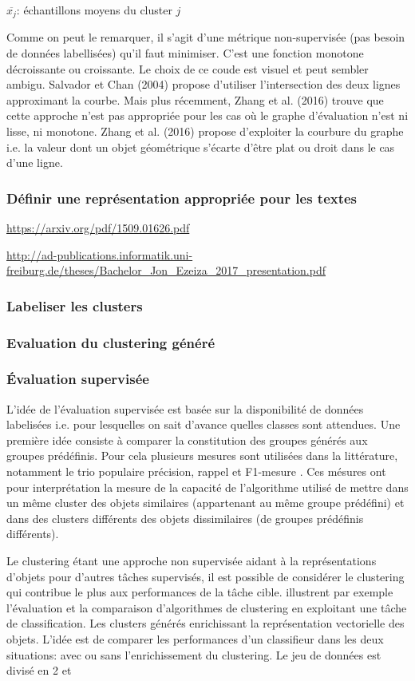 $\overline{x_j}$: échantillons moyens du cluster $j$

Comme on peut le remarquer, il s’agit d’une métrique non-supervisée (pas besoin de données labellisées) qu’il faut minimiser. C’est une fonction monotone décroissante ou croissante. Le choix de ce coude est visuel et peut sembler ambigu. Salvador et Chan (2004) propose d’utiliser l’intersection des deux lignes approximant la courbe. Mais plus récemment, Zhang et al. (2016) trouve que cette approche n’est pas appropriée pour les cas où le graphe d’évaluation n’est ni lisse, ni monotone. Zhang et al. (2016) propose d’exploiter la courbure du graphe i.e. la valeur dont un objet géométrique s'écarte d'être plat ou droit dans le cas d'une ligne.

\subsubsection{Définir une représentation appropriée pour les textes}
\url{https://arxiv.org/pdf/1509.01626.pdf}

\url{http://ad-publications.informatik.uni-freiburg.de/theses/Bachelor_Jon_Ezeiza_2017_presentation.pdf}
\subsubsection{Labeliser les clusters}

\subsubsection{Evaluation du clustering généré}
\subsubsection{Évaluation supervisée}
L'idée de l'évaluation supervisée est basée sur la disponibilité de données labelisées i.e. pour lesquelles on sait d'avance quelles classes sont attendues. Une première idée consiste à comparer la constitution des groupes générés aux groupes prédéfinis. Pour cela plusieurs mesures sont utilisées dans la littérature, notamment le trio populaire précision, rappel et F1-mesure . Ces mésures ont pour interprétation la mesure de la capacité de l'algorithme utilisé de mettre dans un même cluster des objets similaires (appartenant au même groupe prédéfini) et dans des clusters différents des objets dissimilaires (de groupes prédéfinis différents). 
  
  Le clustering étant une approche non supervisée aidant à la représentations d'objets pour d'autres tâches supervisés, il est possible de considérer le clustering qui contribue le plus aux performances de la tâche cible. \citet{candillier2006clustEvalCascad} illustrent par exemple l'évaluation et la comparaison d'algorithmes de clustering en exploitant une tâche de classification. Les clusters générés enrichissant la représentation vectorielle des objets. L'idée est de comparer les performances d'un classifieur dans les deux situations: avec ou sans l'enrichissement du clustering. Le jeu de données est divisé en 2 et 


